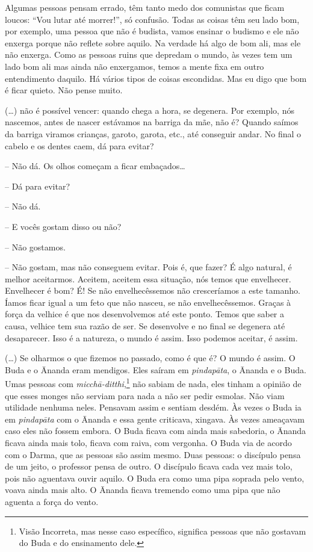 Algumas pessoas pensam errado, têm tanto medo dos comunistas que
ficam loucos: “Vou lutar até morrer!”, só confusão. Todas as coisas têm
seu lado bom, por exemplo, uma pessoa que não é budista, vamos ensinar
o budismo e ele não enxerga porque não reflete sobre aquilo. Na verdade
há algo de bom ali, mas ele não enxerga. Como as pessoas ruins que
depredam o mundo, às vezes tem um lado bom ali mas ainda não
enxergamos, temos a mente fixa em outro entendimento daquilo. Há vários
tipos de coisas escondidas. Mas eu digo que bom é ficar quieto. Não
pense muito.

(…) não é possível vencer: quando chega a hora, se degenera. Por
exemplo, nós nascemos, antes de nascer estávamos na barriga da mãe, não
é? Quando saímos da barriga viramos crianças, garoto, garota, etc., até
conseguir andar. No final o cabelo e os dentes caem, dá para evitar?

-- Não dá. Os olhos começam a ficar embaçados…

-- Dá para evitar?

-- Não dá.

-- E vocês gostam disso ou não?

-- Não gostamos.

-- Não gostam, mas não conseguem evitar. Pois é, que fazer? É algo
natural, é melhor aceitarmos. Aceitem, aceitem essa situação, nós temos
que envelhecer. Envelhecer é bom? É! Se não envelhecêssemos não
cresceríamos a este tamanho. Íamos ficar igual a um feto que não
nasceu, se não envelhecêssemos. Graças à força da velhice é que nos
desenvolvemos até este ponto. Temos que saber a causa, velhice tem sua
razão de ser. Se desenvolve e no final se degenera até desaparecer.
Isso é a natureza, o mundo é assim. Isso podemos aceitar, é assim.

(…) Se olharmos o que fizemos no passado, como é que é? O mundo é
assim. O Buda e o Ānanda eram mendigos. Eles saíram em
\textit{pindapāta}, o Ānanda e o Buda. Umas pessoas com
\textit{micchā-ditthi},\footnote{Visão Incorreta, mas nesse caso
específico, significa pessoas que não gostavam do Buda e do ensinamento
dele.} não sabiam de nada, eles tinham a opinião de que esses
monges não serviam para nada a não ser pedir esmolas. Não viam
utilidade nenhuma neles. Pensavam assim e sentiam desdém. Às vezes o
Buda ia em \textit{pindapāta} com o Ānanda e essa gente criticava,
xingava. Às vezes ameaçavam caso eles não fossem embora. O Buda ficava
com ainda mais sabedoria, o Ānanda ficava ainda mais tolo, ficava com
raiva, com vergonha. O Buda via de acordo com o Darma, que as pessoas
são assim mesmo. Duas pessoas: o discípulo pensa de um jeito, o
professor pensa de outro. O discípulo ficava cada vez mais tolo, pois
não aguentava ouvir aquilo. O Buda era como uma pipa soprada pelo
vento, voava ainda mais alto. O Ānanda ficava tremendo como uma pipa
que não aguenta a força do vento.

